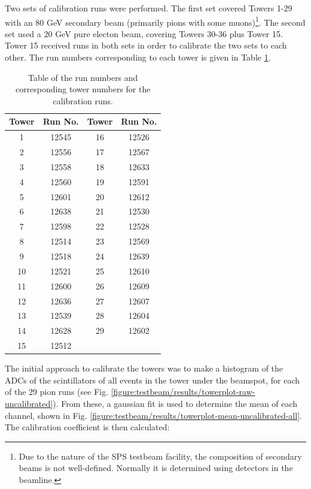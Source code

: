 Two sets of calibration runs were performed. The first set covered Towers 1-29 with an 80 GeV secondary beam (primarily pions with some muons)\footnote{Due to the nature of the \acrshort{SPS} testbeam facility, the composition of secondary beams is not well-defined. Normally it is determined using detectors in the beamline.}. The second set used a 20 GeV pure electon beam, covering Towers 30-36 plus Tower 15. Tower 15 received runs in both sets in order to calibrate the two sets to each other. The run numbers corresponding to each tower is given in Table \ref{table:idea/calibrationruns}.

\begin{table}[h]
\centering
	\begin{tabular}{ c c | c c }
	\hline \hline
	\textbf{Tower} & \textbf{Run No.} & \textbf{Tower} & \textbf{Run No.} \\ \hline \hline
	 1 & 12545 & 16 & 12526 \\
	 2 & 12556 & 17 & 12567 \\
	 3 & 12558 & 18 & 12633 \\
	 4 & 12560 & 19 & 12591 \\
	 5 & 12601 & 20 & 12612 \\
	 6 & 12638 & 21 & 12530 \\
	 7 & 12598 & 22 & 12528 \\
	 8 & 12514 & 23 & 12569 \\
	 9 & 12518 & 24 & 12639 \\
	10 & 12521 & 25 & 12610 \\
	11 & 12600 & 26 & 12609 \\
	12 & 12636 & 27 & 12607 \\
	13 & 12539 & 28 & 12604 \\
	14 & 12628 & 29 & 12602 \\
	15 & 12512 &    &    \\ \hline
	\end{tabular}
	\caption{Table of the run numbers and corresponding tower numbers for the calibration runs.}
	\label{table:idea/calibrationruns}
\end{table}


The initial approach to calibrate the towers was to make a histogram of the \acrshort{ADC}s of the scintillators of all events in the tower under the beamspot, for each of the 29 pion runs (see Fig. \ref{figure:testbeam/results/towerplot-raw-uncalibrated}). From these, a gaussian fit is used to determine the mean of each channel, shown in Fig. \ref{figure:testbeam/results/towerplot-mean-uncalibrated-all}. The calibration coefficient is then calculated: \\

